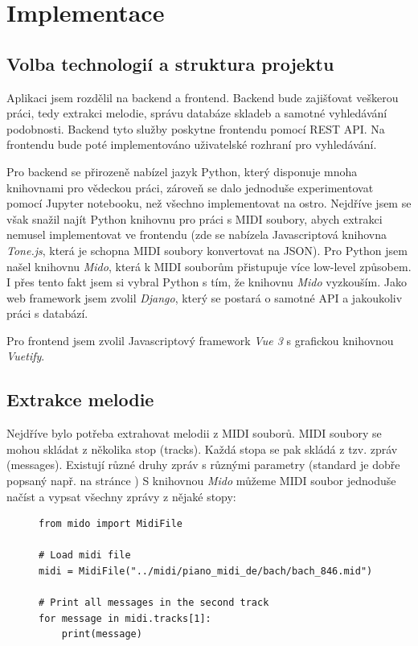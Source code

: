 \section{Implementace}

\subsection{Volba technologií a struktura projektu}
Aplikaci jsem rozdělil na backend a frontend. Backend bude zajišťovat veškerou  práci, tedy extrakci melodie, správu databáze skladeb a samotné vyhledávání podobnosti. Backend tyto služby poskytne frontendu pomocí REST API. Na frontendu bude poté implementováno uživatelské rozhraní pro vyhledávání.

Pro backend se přirozeně nabízel jazyk Python, který disponuje mnoha knihovnami pro vědeckou práci, zároveň se dalo jednoduše experimentovat pomocí Jupyter notebooku, než všechno implementovat na ostro. Nejdříve jsem se však snažil najít Python knihovnu pro práci s MIDI soubory, abych extrakci nemusel implementovat ve frontendu (zde se nabízela Javascriptová knihovna \textit{Tone.js}, která je schopna MIDI soubory konvertovat na JSON). Pro Python jsem našel knihovnu \textit{Mido}, která k MIDI souborům přistupuje více low-level způsobem. I přes tento fakt jsem si vybral Python s tím, že knihovnu \textit{Mido} vyzkouším. Jako web framework jsem zvolil \textit{Django}, který se postará o samotné API a jakoukoliv práci s databází.

Pro frontend jsem zvolil Javascriptový framework \textit{Vue 3} s grafickou knihovnou \textit{Vuetify}.

\subsection{Extrakce melodie}
Nejdříve bylo potřeba extrahovat melodii z MIDI souborů. MIDI soubory se mohou skládat z několika stop (tracks). Každá stopa se pak skládá z tzv. zpráv (messages). Existují různé druhy zpráv s různými parametry (standard je dobře popsaný např. na stránce \cite{midi-standard})
S knihovnou \textit{Mido} \cite{mido} můžeme MIDI soubor jednoduše načíst a vypsat všechny zprávy z nějaké stopy: 

\begin{figure}[!ht]
    \begin{verbatim}
from mido import MidiFile

# Load midi file
midi = MidiFile("../midi/piano_midi_de/bach/bach_846.mid")

# Print all messages in the second track
for message in midi.tracks[1]:
    print(message)
    \end{verbatim}
\end{figure}

